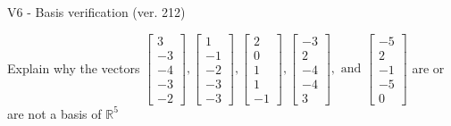 \begin{exercise}
  \begin{exerciseTitle}V6 - Basis verification (ver. 212)\end{exerciseTitle}
  \begin{exerciseStatement}
    Explain why the vectors \(\left[\begin{array}{r}
3 \\
-3 \\
-4 \\
-3 \\
-2
\end{array}\right] , \left[\begin{array}{r}
1 \\
-1 \\
-2 \\
-3 \\
-3
\end{array}\right] , \left[\begin{array}{r}
2 \\
0 \\
1 \\
1 \\
-1
\end{array}\right] , \left[\begin{array}{r}
-3 \\
2 \\
-4 \\
-4 \\
3
\end{array}\right] , \text{ and } \left[\begin{array}{r}
-5 \\
2 \\
-1 \\
-5 \\
0
\end{array}\right]\) are or are not a basis of \(\mathbb{R}^5\)	



\end{exerciseStatement}
\end{exercise}
